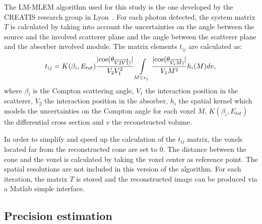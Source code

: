 The LM-MLEM algorithm used for this study is the one developed by the CREATIS research group in Lyon~\cite{maxim_analytical_2009,lojacono_low_2013,maxim_filtered_2014,hilaire_compton_2014}.\newline
For each photon detected, the system matrix $T$ is calculated by taking into account the uncertainties on the angle between the source and the involved scatterer plane and the angle between the scatterer plane and the absorber involved module.
The matrix elements $t_{ij}$ are calculated as:
\begin{equation}
 t_{ij} = K(\beta_i,E_{tot})\frac{|\rm{cos}(\theta_{\overrightarrow{V2V1})} |}{V_2V_1^2} \int\limits_{M\in v_j} \frac{|\rm{cos}(\theta_{\overrightarrow{V_1M})}| }{V_1M^2} h_i(M)dv,
 \label{eq:equation_tij_compton_med_nucleaire}\newline
\end{equation}
where $\beta_i$ is the Compton scattering angle, $V_1$ the interaction position in the scatterer, $V_2$ the interaction position in the absorber, $h_i$ the spatial kernel which models the uncertainties on the Compton angle for each voxel $M$, $K(\beta_i,E_{tot})$ the differential cross section and $v$ the reconstructed volume.\newline

In order to simplify and speed up the calculation of the $t_{ij}$ matrix, the voxels located far from the reconstructed cone are set to 0. The distance between the cone and the voxel is calculated by taking the voxel center as reference point. The spatial resolutions are not included in this version of the algorithm.\newline
For each iteration, the matrix $T$ is stored and the reconstructed image can be produced via a Matlab simple interface.

\subsection{Precision estimation}

